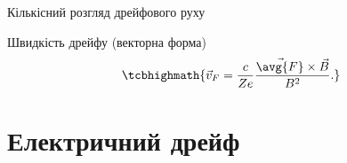 \documentclass[]{beamer}
\begin{document}
\begin{frame}{Кількісний розгляд дрейфового руху}{}
\begin{onlyenv}
		\begin{block}{Швидкість дрейфу (векторна форма)}
			\begin{equation*}
				\tcbhighmath{
					\vec{v}_F = \frac{c}{Ze}\frac{\vec{\avg{F}}\times\vec{B}}{B^2}.
				}
			\end{equation*}
		\end{block}
	\end{onlyenv}
\end{frame}





\section{Електричний дрейф}
\end{document}
